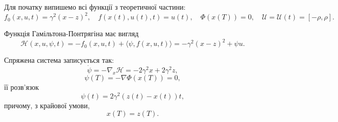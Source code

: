 \begin{solution}
    Для початку випишемо всі функції з теоретичної частини:
    \begin{equation}
        f_0(x, u, t) = \gamma^2 (x - z)^2, \quad f(x(t), u(t), t) = u(t), \quad \Phi(x(T)) = 0, \quad \mathcal{U} = \mathcal{U}(t) = [-\rho, \rho].
    \end{equation}
    
    Функція Гамільтона-Понтрягіна має вигляд
    \begin{equation}
        \mathcal{H} (x, u, \psi, t) = - f_0(x, u, t) + \langle \psi, f(x, u, t) \rangle = - \gamma^2 (x - z)^2 + \psi u.
    \end{equation}
    
    Спряжена система записується так:
    \begin{equation}
        \dot \psi = - \nabla_x \mathcal{H} = - 2 \gamma^2 x + 2 \gamma^2 z,
    \end{equation}
    \begin{equation} 
        \psi(T) = - \nabla \Phi(x(T)) = 0,
    \end{equation}
    її розв'язок 
    \begin{equation}
        \psi (t) = 2 \gamma^2 (z(t) - x(t)) t,
    \end{equation}
    причому, з крайової умови,
    \begin{equation}
        x(T) = z(T).
    \end{equation}
\end{solution}








